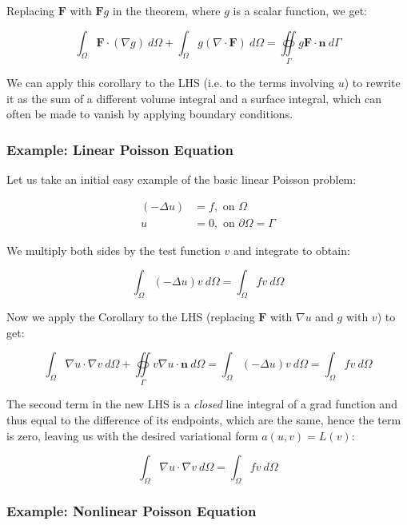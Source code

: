\documentclass[english, 11pt]{article}
\begin{document}
  \begin{cor}
  	Replacing $\bm{F}$ with $\bm{F}g$ in the theorem, where $g$ is a scalar function, we get:
  	
  	\[ \int_{\Omega} \bm{F} \cdot (\nabla g) \ d\Omega + \int_{\Omega} g(\nabla \cdot \bm{F}) \ d\Omega = \oiint \limits_{\Gamma} g\bm{F} \cdot \bm{n} \ d\Gamma \]
  \end{cor}
  
  We can apply this corollary to the LHS (i.e. to the terms involving $u$) to rewrite it as the sum of a different volume integral and a surface integral, which can often be made to vanish by applying boundary conditions.
  
  \subsubsection{Example: Linear Poisson Equation}
  
  Let us take an initial easy example of the basic linear Poisson problem:
  
  \begin{align*}
  	(-\Delta u) &= f , \text{ on } \Omega \\
  	u &= 0 , \text{ on } \partial\Omega = \Gamma
  \end{align*}
  
  We multiply both sides by the test function $v$ and integrate to obtain:
  
  \[ \int_{\Omega} (-\Delta u)v \ d\Omega = \int_{\Omega} fv \ d\Omega \]
  
  Now we apply the Corollary to the LHS (replacing $\bm{F}$ with $\nabla u$ and $g$ with $v$) to get: 
  
  \[ \int_{\Omega} \nabla u \cdot \nabla v \ d\Omega + \oiint \limits_{\Gamma} v \nabla u \cdot \bm{n} \ d\Omega = \int_{\Omega} (-\Delta u)v \ d\Omega = \int_{\Omega} fv \ d\Omega  \]
  
  The second term in the new LHS is a \emph{closed} line integral of a grad function and thus equal to the difference of its endpoints, which are the same, hence the term is zero, leaving us with the desired variational form $a(u,v) = L(v)$:
  
  \[ \int_{\Omega} \nabla u \cdot \nabla v \ d\Omega = \int_{\Omega} fv \ d\Omega \]
  
  
  \subsubsection{Example: Nonlinear Poisson Equation}
  
\end{document}

